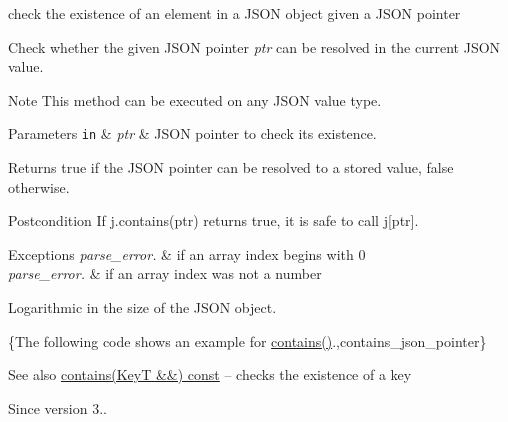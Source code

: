 check the existence of an element in a J\+S\+ON object given a J\+S\+ON pointer 

Check whether the given J\+S\+ON pointer {\itshape ptr} can be resolved in the current J\+S\+ON value.

\begin{DoxyNote}{Note}
This method can be executed on any J\+S\+ON value type.
\end{DoxyNote}

\begin{DoxyParams}[1]{Parameters}
\mbox{\tt in}  & {\em ptr} & J\+S\+ON pointer to check its existence.\\
\hline
\end{DoxyParams}
\begin{DoxyReturn}{Returns}
true if the J\+S\+ON pointer can be resolved to a stored value, false otherwise.
\end{DoxyReturn}
\begin{DoxyPostcond}{Postcondition}
If {\ttfamily j.\+contains(ptr)} returns true, it is safe to call {\ttfamily j\mbox{[}ptr\mbox{]}}.
\end{DoxyPostcond}

\begin{DoxyExceptions}{Exceptions}
{\em parse\+\_\+error.} & if an array index begins with \textquotesingle{}0\textquotesingle{} \\
\hline
{\em parse\+\_\+error.} & if an array index was not a number\\
\hline
\end{DoxyExceptions}
Logarithmic in the size of the J\+S\+ON object.

\{The following code shows an example for {\ttfamily \hyperlink{classnlohmann_1_1basic__json_a2a8dc024698f32cf8b01b2de93835202}{contains()}}.,contains\+\_\+json\+\_\+pointer\}

\begin{DoxySeeAlso}{See also}
\hyperlink{classnlohmann_1_1basic__json_a2a8dc024698f32cf8b01b2de93835202}{contains(\+Key\+T \&\&) const} -- checks the existence of a key
\end{DoxySeeAlso}
\begin{DoxySince}{Since}
version 3.. 
\end{DoxySince}
